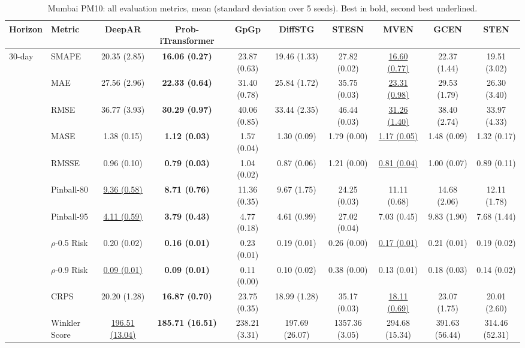 \begin{table}[t]
\centering\scriptsize
\setlength{\tabcolsep}{3pt}
\caption{Mumbai PM10: all evaluation metrics, mean (standard deviation over 5 seeds). Best in bold, second best underlined.}
\label{tab:mumbai_pm10_all}
\begin{tabular}{llcccccccc}
\toprule
Horizon & Metric & DeepAR & Prob-iTransformer & GpGp & DiffSTG & STESN & MVEN & GCEN & STEN \\
\midrule
\multirow{14}{*}{30-day} & SMAPE & 20.35 (2.85) & \textbf{16.06 (0.27)} & 23.87 (0.63) & 19.46 (1.33) & 27.82 (0.02) & \underline{16.60 (0.77)} & 22.37 (1.44) & 19.51 (3.02) \\
 & MAE & 27.56 (2.96) & \textbf{22.33 (0.64)} & 31.40 (0.78) & 25.84 (1.72) & 35.75 (0.03) & \underline{23.31 (0.98)} & 29.53 (1.79) & 26.30 (3.40) \\
 & RMSE & 36.77 (3.93) & \textbf{30.29 (0.97)} & 40.06 (0.85) & 33.44 (2.35) & 46.44 (0.03) & \underline{31.26 (1.40)} & 38.40 (2.74) & 33.97 (4.33) \\
 & MASE & 1.38 (0.15) & \textbf{1.12 (0.03)} & 1.57 (0.04) & 1.30 (0.09) & 1.79 (0.00) & \underline{1.17 (0.05)} & 1.48 (0.09) & 1.32 (0.17) \\
 & RMSSE & 0.96 (0.10) & \textbf{0.79 (0.03)} & 1.04 (0.02) & 0.87 (0.06) & 1.21 (0.00) & \underline{0.81 (0.04)} & 1.00 (0.07) & 0.89 (0.11) \\
 & Pinball-80 & \underline{9.36 (0.58)} & \textbf{8.71 (0.76)} & 11.36 (0.35) & 9.67 (1.75) & 24.25 (0.03) & 11.11 (0.68) & 14.68 (2.06) & 12.11 (1.78) \\
 & Pinball-95 & \underline{4.11 (0.59)} & \textbf{3.79 (0.43)} & 4.77 (0.18) & 4.61 (0.99) & 27.02 (0.04) & 7.03 (0.45) & 9.83 (1.90) & 7.68 (1.44) \\
 & $\rho$-0.5 Risk & 0.20 (0.02) & \textbf{0.16 (0.01)} & 0.23 (0.01) & 0.19 (0.01) & 0.26 (0.00) & \underline{0.17 (0.01)} & 0.21 (0.01) & 0.19 (0.02) \\
 & $\rho$-0.9 Risk & \underline{0.09 (0.01)} & \textbf{0.09 (0.01)} & 0.11 (0.00) & 0.10 (0.02) & 0.38 (0.00) & 0.13 (0.01) & 0.18 (0.03) & 0.14 (0.02) \\
 & CRPS & 20.20 (1.28) & \textbf{16.87 (0.70)} & 23.75 (0.35) & 18.99 (1.28) & 35.17 (0.03) & \underline{18.11 (0.69)} & 23.07 (1.75) & 20.01 (2.60) \\
 & Winkler Score & \underline{196.51 (13.04)} & \textbf{185.71 (16.51)} & 238.21 (3.31) & 197.69 (26.07) & 1357.36 (3.05) & 294.68 (15.34) & 391.63 (56.44) & 314.46 (52.31) \\

\end{tabular}
\end{table}

